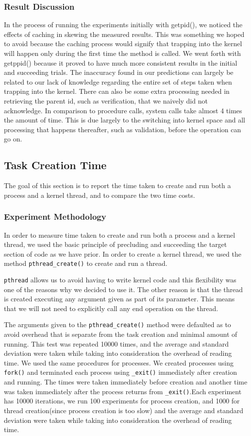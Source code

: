 \documentclass{article} %
\begin{document}
\subsubsection{Result Discussion}
In the process of running the experiments initially with getpid(), we noticed the effects of caching in skewing the measured results. This was something we hoped to avoid because the caching process would signify that trapping into the kernel will happen only during the first time the method is called. We went forth with getppid() because it proved to have much more consistent results in the initial and succeeding trials. The inaccuracy found in our predictions can largely be related to our lack of knowledge regarding the entire set of steps taken when trapping into the kernel. There can also be some extra processing needed in retrieving the parent id, such as verification, that we naively did not acknowledge. In comparison to procedure calls, system calls take almost 4 times the amount of time. This is due largely to the switching into kernel space and all processing that happens thereafter, such as validation, before the operation can go on.

\subsection{Task Creation Time}
The goal of this section is to report the time taken to create and run both
a process and a kernel thread, and to compare the two time costs.

\subsubsection{Experiment Methodology}
In order to measure time taken to create and run both a process and a kernel
thread, we used the basic principle of precluding and succeeding the target
section of code as we have prior. In order to create a kernel thread, we used
the method \texttt{pthread\_create()} to create and run a thread.

\texttt{pthread} allows us to avoid having to write kernel code and this
flexibility was one of the reasons why we decided to use it. The other reason
is that the thread is created executing any argument given as part of its
parameter. This means that we will not need to explicitly call any end
operation on the thread.

The arguments given to the \texttt{pthread\_create()} method were defaulted as
to avoid overhead that is separate from the task creation and minimal amount
of running. This test was repeated 10000 times, and the average and standard
deviation were taken while taking into consideration the overhead of reading
time. We used the same procedures for processes. We created processes using
\texttt{fork()} and terminated each process using \texttt{\_exit()}
immediately after creation and running.  The times were taken immediately before creation and another time was taken immediately after the process returns from \texttt{\_exit()}.Each experiment has 10000 iterations,
we run 100 experiments for process creation, and 1000 for thread
creation(since process creation is too slow) and the average and standard
deviation were taken while taking into consideration the overhead of reading
time.
\end{document}
